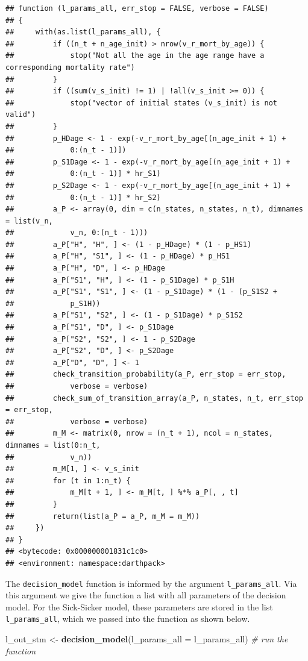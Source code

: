 \documentclass[]{book}
\newenvironment{Shaded}{\begin{snugshade}}{\end{snugshade}}
\newcommand{\CommentTok}[1]{\textcolor[rgb]{0.56,0.35,0.01}{\textit{#1}}}
\newcommand{\DataTypeTok}[1]{\textcolor[rgb]{0.13,0.29,0.53}{#1}}
\newcommand{\KeywordTok}[1]{\textcolor[rgb]{0.13,0.29,0.53}{\textbf{#1}}}
\newcommand{\NormalTok}[1]{#1}
\newcommand{\StringTok}[1]{\textcolor[rgb]{0.31,0.60,0.02}{#1}}
\begin{document}
\begin{verbatim}
## function (l_params_all, err_stop = FALSE, verbose = FALSE) 
## {
##     with(as.list(l_params_all), {
##         if ((n_t + n_age_init) > nrow(v_r_mort_by_age)) {
##             stop("Not all the age in the age range have a corresponding mortality rate")
##         }
##         if ((sum(v_s_init) != 1) | !all(v_s_init >= 0)) {
##             stop("vector of initial states (v_s_init) is not valid")
##         }
##         p_HDage <- 1 - exp(-v_r_mort_by_age[(n_age_init + 1) + 
##             0:(n_t - 1)])
##         p_S1Dage <- 1 - exp(-v_r_mort_by_age[(n_age_init + 1) + 
##             0:(n_t - 1)] * hr_S1)
##         p_S2Dage <- 1 - exp(-v_r_mort_by_age[(n_age_init + 1) + 
##             0:(n_t - 1)] * hr_S2)
##         a_P <- array(0, dim = c(n_states, n_states, n_t), dimnames = list(v_n, 
##             v_n, 0:(n_t - 1)))
##         a_P["H", "H", ] <- (1 - p_HDage) * (1 - p_HS1)
##         a_P["H", "S1", ] <- (1 - p_HDage) * p_HS1
##         a_P["H", "D", ] <- p_HDage
##         a_P["S1", "H", ] <- (1 - p_S1Dage) * p_S1H
##         a_P["S1", "S1", ] <- (1 - p_S1Dage) * (1 - (p_S1S2 + 
##             p_S1H))
##         a_P["S1", "S2", ] <- (1 - p_S1Dage) * p_S1S2
##         a_P["S1", "D", ] <- p_S1Dage
##         a_P["S2", "S2", ] <- 1 - p_S2Dage
##         a_P["S2", "D", ] <- p_S2Dage
##         a_P["D", "D", ] <- 1
##         check_transition_probability(a_P, err_stop = err_stop, 
##             verbose = verbose)
##         check_sum_of_transition_array(a_P, n_states, n_t, err_stop = err_stop, 
##             verbose = verbose)
##         m_M <- matrix(0, nrow = (n_t + 1), ncol = n_states, dimnames = list(0:n_t, 
##             v_n))
##         m_M[1, ] <- v_s_init
##         for (t in 1:n_t) {
##             m_M[t + 1, ] <- m_M[t, ] %*% a_P[, , t]
##         }
##         return(list(a_P = a_P, m_M = m_M))
##     })
## }
## <bytecode: 0x000000001831c1c0>
## <environment: namespace:darthpack>
\end{verbatim}

The \texttt{decision\_model} function is informed by the argument \texttt{l\_params\_all}. Via this argument we give the function a list with all parameters of the decision model. For the Sick-Sicker model, these parameters are stored in the list \texttt{l\_params\_all}, which we passed into the function as shown below.

\begin{Shaded}
\begin{Highlighting}[]
\NormalTok{l_out_stm <-}\StringTok{ }\KeywordTok{decision_model}\NormalTok{(}\DataTypeTok{l_params_all =}\NormalTok{ l_params_all) }\CommentTok{# run the function}
\end{Highlighting}
\end{Shaded}
\end{document}
